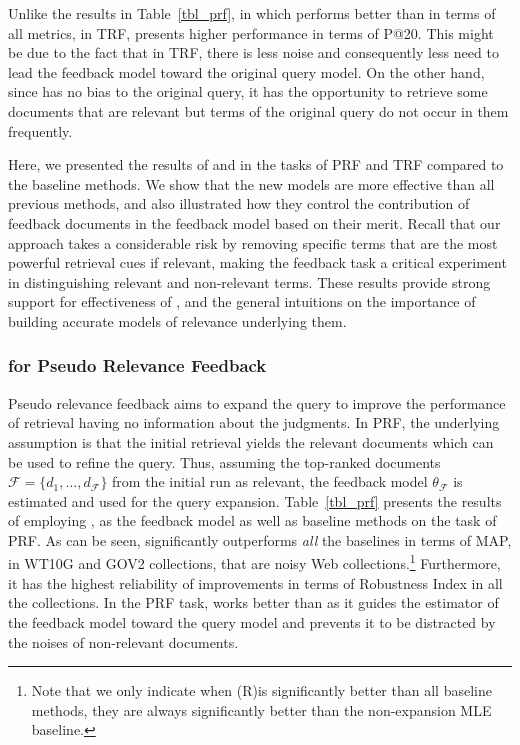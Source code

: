 Unlike the results in Table~\ref{tbl_prf}, in which \acrswlm performs better than \acswlm in terms of all metrics, in TRF, \acswlm presents higher performance in terms of P@20. This might be due to the fact that in TRF, there is less noise and consequently less need to lead the feedback model toward the original query model. On the other hand, since \acrswlm has no bias to the original query, it has the opportunity to retrieve some documents that are relevant but terms of the original query do not occur in them frequently. 

\medskip
Here, we presented the results of \acswlm  and \acrswlm  in the tasks of PRF and TRF compared to the baseline methods.
We show that the new models are more effective than all previous methods, and also illustrated how they control the contribution of feedback documents in the feedback model based on their merit.
Recall that our approach takes a considerable risk by removing specific terms that are the most powerful retrieval cues if relevant, making the feedback task a critical experiment in distinguishing relevant and non-relevant terms. 
%
These results provide strong support for effectiveness of \swlms, and the general intuitions on the importance of building accurate models of relevance underlying them.


\subsubsection{\acswlm for Pseudo Relevance Feedback}
\label{sec:PRF}
Pseudo relevance feedback aims to expand the query to improve the performance of retrieval having no information about the judgments. In PRF, the underlying assumption is that the initial retrieval yields the relevant documents which can be used to refine the query. Thus, assuming the top-ranked documents $\mathcal{F} = \{d_1, \ldots ,d_{\mathcal{F}}\}$ from the initial run as relevant, the feedback model $\theta_{\mathcal{F}}$ is estimated and used for the query expansion.  
Table~\ref{tbl_prf} presents the results of employing \swlms, \rswlms as the feedback model as well as baseline methods on the task of PRF\@. 
As can be seen, \acrswlm significantly outperforms \emph{all} the baselines in terms of MAP, in WT10G and GOV2 collections, that are noisy Web collections.\footnote{Note that we only indicate when (R)\acswlm is significantly better than all baseline methods, they are always significantly better than the non-expansion MLE baseline.} Furthermore, it has the highest reliability of improvements in terms of Robustness Index in all the collections.
In the PRF task, \acrswlm works better than \acswlm as it guides the estimator of the feedback model toward the query model and prevents it to be distracted by the noises of non-relevant documents.


